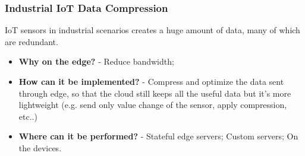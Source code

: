 \subsubsection{Industrial IoT Data Compression}
IoT sensors in industrial scenarios creates a huge amount of data, many of which are redundant.
\begin{itemize}
    \item \textbf{Why on the edge?} - Reduce bandwidth;
    \item \textbf{How can it be implemented?} - Compress and optimize the data sent through edge, so that the cloud still keeps all the useful data but it’s more lightweight (e.g. send only value change of the sensor, apply compression, etc..)
    \item \textbf{Where can it be performed?} - Stateful edge servers; Custom servers; On the devices.
\end{itemize}





\iffalse
This chapter is dedicated to the formal presentation of the problem with the technical details. Here your should put also the figure of merit you use to compare your solution with the ones of the related works you presented.

In this thesis, we address the problem of ... . [Description of the problem and classical approaches]. The figure of merit we use to compare the solutions is ... .
\fi
